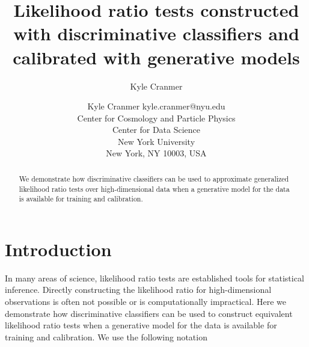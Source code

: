 \documentclass[11pt, oneside]{article}   	%
\title{Likelihood ratio tests constructed with discriminative classifiers and calibrated with generative models}
\author{Kyle Cranmer}
\begin{document}
\author{\name Kyle Cranmer \email kyle.cranmer@nyu.edu \\
       \addr Center for Cosmology and Particle Physics\\
       Center for Data Science\\
       New York University \\
       New York, NY 10003, USA
}

\editor{}

\maketitle

\begin{abstract}%
We demonstrate how discriminative classifiers can be used to approximate 
generalized likelihood ratio tests over high-dimensional data when a generative model 
for the data is available for training and calibration.  
\end{abstract}
%




\maketitle

\section{Introduction}


In many areas of science, likelihood ratio tests  are established tools for statistical inference. 
Directly constructing the likelihood ratio for high-dimensional observations 
is often not possible or is computationally impractical. Here we demonstrate how 
discriminative classifiers can be used to construct equivalent likelihood ratio tests when 
a generative model for the data is available for training and calibration.  We use the following notation
\end{document}
